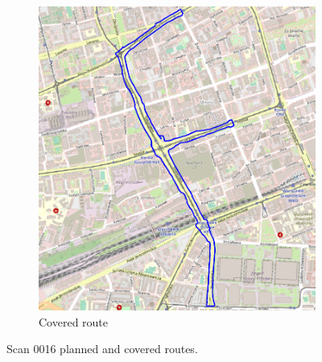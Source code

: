 \documentclass[a4paper,12pt]{article}
\begin{document}
\begin{enumerate}
\begin{figure}[H]
\begin{subfigure}{.63\textwidth}
			\includegraphics[width=1\linewidth]{route_c16}
			\caption{Covered route}
			\label{fig:b16}
		\end{subfigure}
		\caption{Scan 0016 planned and covered routes.}
		\label{fig:fig16}
	\end{figure} 
\end{enumerate}
\end{document}
